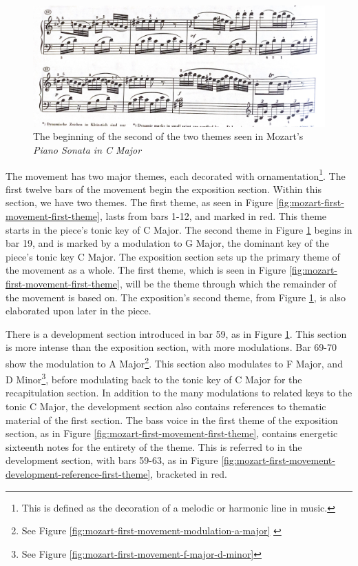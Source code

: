 \begin{figure}
    \centering
    \includegraphics[width=\textwidth]{figures/mozart-first-movement-second-theme.jpg}
    \caption[The second theme in Mozart's \textit{Piano Sonata in C Major, K. 330}]{The beginning of the second of the two themes seen in Mozart's \textit{Piano Sonata in C Major}}
    \label{fig:mozart-first-movement-second-theme}
\end{figure}

The movement has two major themes, each decorated with ornamentation\footnote{This is defined as the decoration of a melodic or harmonic line in music.}\autocite{Latham_2011a}\autocite{Burkholder_Grout_Palisca_2014}. The first twelve bars of the movement begin the exposition section. Within this section, we have two themes. The first theme, as seen in Figure \ref{fig:mozart-first-movement-first-theme}\autocite{Henle_1977}, lasts from bars 1-12, and marked in red. This theme starts in the piece's tonic key of C Major. The second theme in Figure \ref{fig:mozart-first-movement-second-theme}\autocite{Henle_1977} begins in bar 19, and is marked by a modulation to G Major, the dominant key of the piece's tonic key C Major. The exposition section sets up the primary theme of the movement as a whole. The first theme, which is seen in Figure \ref{fig:mozart-first-movement-first-theme}\autocite{Henle_1977}, will be the theme through which the remainder of the movement is based on. The exposition's second theme, from Figure \ref{fig:mozart-first-movement-second-theme}\autocite{Henle_1977}, is also elaborated upon later in the piece. 

There is a development section introduced in bar 59, as in Figure \ref{fig:mozart-first-movement-second-theme}\autocite{Henle_1977}. This section is more intense than the exposition section, with more modulations. Bar 69-70 show the modulation to A Major\footnote{See Figure \ref{fig:mozart-first-movement-modulation-a-major} \autocite{Henle_1977}}. This section also modulates to F Major, and D Minor\footnote{See Figure \ref{fig:mozart-first-movement-f-major-d-minor}}\autocite{Henle_1977}, before modulating back to the tonic key of C Major for the recapitulation section. In addition to the many modulations to related keys to the tonic C Major, the development section also contains references to thematic material of the first section. The bass voice in the first theme of the exposition section, as in Figure \ref{fig:mozart-first-movement-first-theme}\autocite{Henle_1977}, contains energetic sixteenth notes for the entirety of the theme. This is referred to in the development section, with bars 59-63, as in Figure \ref{fig:mozart-first-movement-development-reference-first-theme}\autocite{Henle_1977}, bracketed in red. 

